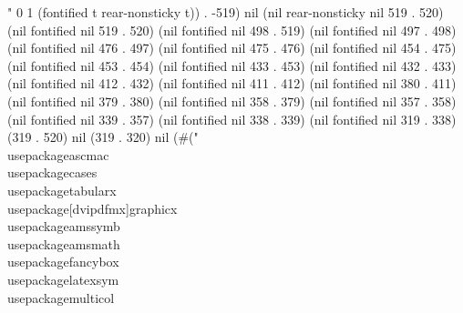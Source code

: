 " 0 1 (fontified t rear-nonsticky t)) . -519) nil (nil rear-nonsticky nil 519 . 520) (nil fontified nil 519 . 520) (nil fontified nil 498 . 519) (nil fontified nil 497 . 498) (nil fontified nil 476 . 497) (nil fontified nil 475 . 476) (nil fontified nil 454 . 475) (nil fontified nil 453 . 454) (nil fontified nil 433 . 453) (nil fontified nil 432 . 433) (nil fontified nil 412 . 432) (nil fontified nil 411 . 412) (nil fontified nil 380 . 411) (nil fontified nil 379 . 380) (nil fontified nil 358 . 379) (nil fontified nil 357 . 358) (nil fontified nil 339 . 357) (nil fontified nil 338 . 339) (nil fontified nil 319 . 338) (319 . 520) nil (319 . 320) nil (#("\\usepackage{ascmac}
\\usepackage{cases}
\\usepackage{tabularx}
\\usepackage[dvipdfmx]{graphicx}
\\usepackage{amssymb}
\\usepackage{amsmath}
\\usepackage{fancybox}
\\usepackage{latexsym}
\\usepackage{multicol}
